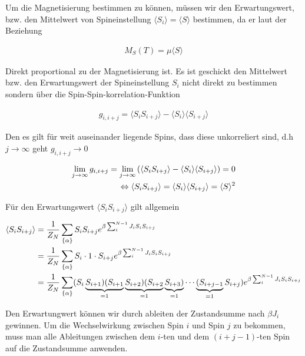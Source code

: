 Um die Magnetisierung bestimmen zu können, müssen wir den Erwartungswert, bzw. den Mittelwert von Spineinstellung \(\langle S_i\rangle =\langle S\rangle \) bestimmen, da er laut der Beziehung

\begin{align}
  \label{eq:9}
  M_S(T) = \mu \langle S\rangle
\end{align}

Direkt proportional zu der Magnetisierung ist. Es ist geschickt den Mittelwert bzw. den Erwartungswert der Spineinstellung \(S_i\) nicht direkt zu bestimmen sondern über die Spin-Spin-korrelation-Funktion

\begin{align}
  \label{eq:10}
  g_{i,i+j} = \langle S_iS_{i+j}\rangle - \langle S_i\rangle\langle S_{i+j}\rangle
\end{align}

Den es gilt für weit auseinander liegende Spins, dass diese unkorreliert sind, d.h \(j\to\infty\) geht \(g_{i,i+j}\to 0\)

\begin{align}
  \label{eq:11}
   \lim_{j\to\infty} g_{i,i+j} = \lim_{j\to\infty}\left( \langle S_iS_{i+j}\rangle - \langle S_i\rangle\langle S_{i+j}\rangle\right) = 0 \notag\\
\Leftrightarrow \langle S_iS_{i+j}\rangle = \langle S_i\rangle\langle S_{i+j}\rangle = \langle S \rangle^2
\end{align}

Für den Erwartungswert \(\langle S_iS_{i+j}\rangle\) gilt allgemein

\begin{align}
  \label{eq:12}
  \langle S_iS_{i+j}\rangle &= \frac{1}{Z_N} \sum_{\{\alpha\}} S_i S_{i+j}  e^{\beta \sum_i^{N-1}J_iS_i S_{i+j} } \notag\\
&= \frac{1}{Z_N} \sum_{\{\alpha\}} S_i \cdot 1\cdot S_{i+j}  e^{\beta \sum_i^{N-1}J_iS_i S_{i+j} } \notag\\
&= \frac{1}{Z_N} \sum_{\{\alpha\}} (S_i\underbr{S_{i+1})(S_{i+1}}_{=1}\underbr{S_{i+2})(S_{i+2}}_{=1}\underbr{S_{i+3})}_{=1}\cdots\underbr{(S_{i+j-1}}_{=1} S_{i+j})  e^{\beta \sum_i^{N-1}J_iS_i S_{i+j} } 
\end{align}

Den Erwartungwert können wir durch ableiten der Zustandsumme nach \(\beta J_i\) gewinnen. Um die Wechselwirkung zwischen Spin \(i\) und Spin \(j\) zu bekommen, muss man alle Ableitungen zwischen dem \(i\)-ten und dem \((i+j-1)\)-ten Spin auf die Zustandsumme anwenden.

